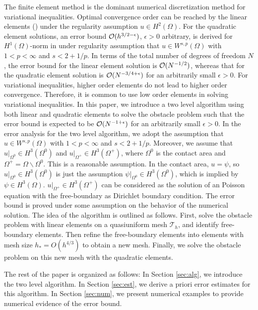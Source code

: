 \documentclass[12pt]{article}
\begin{document}
The finite element method is the dominant numerical discretization method for 
variational inequalities. Optimal convergence order can be reached by the
linear elements (\cite{falk74, glowinski84, wang10, wang11, wang14}) under the regularity assumption 
$u\in H^2(\Omega)$.  For the quadratic element solutions, an error bound 
${\cal O}(h^{3/2-\epsilon})$, $\epsilon>0$ arbitrary, is derived for $H^1(\Omega)$-norm 
in \cite{wang02} under regularity assumption that $u\in W^{s,p}(\Omega)$ with 
$1<p<\infty$ and $s<2+1/p$.  In terms of the total number of degrees of freedom $N$, the
error bound for the linear element solution is ${\cal O}(N^{-1/2})$, whereas that for the 
quadratic element solution is ${\cal O}(N^{-3/4+\epsilon})$ for an arbitrarily small $\epsilon>0$.
For variational inequalities, higher order elements do not
lead to higher order convergence.  Therefore, it is common to use low order elements 
in solving variational inequalities.  In this paper, we introduce a two level algorithm
using both linear and quadratic elements to solve the obstacle problem such that the 
error bound is expected to be ${\cal O}(N^{-1+\epsilon})$ for an arbitrarily small $\epsilon>0$. 
In the error analysis for the two level algorithm, we adopt the assumption that 
$u\in W^{s,p}(\Omega)$ with $1<p<\infty$ and $s<2+1/p$. Moreover, we assume that 
$u|_{\Omega^0}\in H^3(\Omega^0)$ and $u|_{\Omega^+}\in H^3(\Omega^+)$, where $\Omega^0$ 
is the contact area and $\Omega^+ = \Omega\backslash \Omega^0$. 
This is a reasonable assumption. In the contact area, $u=\psi$, 
so $u|_{\Omega^0}\in H^3(\Omega^0)$ is just the assumption $\psi|_{\Omega^0}\in H^3(\Omega^0)$, 
which is implied by $\psi\in H^3(\Omega)$. $u|_{\Omega^+}\in H^3(\Omega^+)$ can be 
considered as the solution of an Poisson equation with the free-boundary as Dirichlet 
boundary condition.  The error bound is proved under some assumption on the behavior 
of the numerical solution. The idea of the algorithm is outlined as follows.  First, 
solve the obstacle problem with linear elements on a quasiuniform mesh $\mathcal{T}_h$, 
and identify free-boundary 
elements. Then refine the free-boundary elements into elements with mesh size 
$h_* = O(h^{4/3})$ to obtain a new mesh. Finally, we solve the obstacle problem on 
this new mesh with the quadratic elements. 

The rest of the paper is organized as follows: In Section \ref{sec:alg}, we introduce
the two level  algorithm. In Section \ref{sec:est}, we derive a priori error
estimates for this algorithm.  In Section \ref{sec:num}, we present numerical examples to 
provide numerical evidence of the error bound.  
\end{document}
